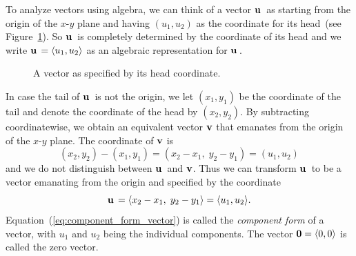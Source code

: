 To analyze vectors using algebra, we can think of a vector $\operatorname*{\mathbf{u}}{}$
as starting from the origin of the $x$-$y$ plane and having
$(u_1, u_2)$ as the coordinate for its head~(see
Figure~\ref{fig:specify_vector_head_coordinate}). So $\operatorname*{\mathbf{u}}{}$ is
completely determined by the coordinate of its head and we write
$\operatorname*{\mathbf{u}}{} = \langle u_1, u_2 \rangle$ as an algebraic representation
for $\operatorname*{\mathbf{u}}{}$.

\begin{figure}[!htpb]
\centering
{}
\caption{A vector as specified by its head coordinate.}
\label{fig:specify_vector_head_coordinate}
\end{figure}

In case the tail of $\operatorname*{\mathbf{u}}{}$ is not the
origin, we let $(x_1, y_1)$ be the coordinate of the tail and denote
the coordinate of the head by $(x_2, y_2)$. By subtracting
coordinatewise, we obtain an equivalent vector $\operatorname*{\mathbf{v}}$ that emanates
from the origin of the $x$-$y$ plane. The coordinate of $\operatorname*{\mathbf{v}}$ is
\[
(x_2, y_2) - (x_1, y_1)
=
(x_2 - x_1,\; y_2 - y_1)
=
(u_1, u_2)
\]
and we do not distinguish between $\operatorname*{\mathbf{u}}{}$ and $\operatorname*{\mathbf{v}}$. Thus we
can transform $\operatorname*{\mathbf{u}}{}$ to be a vector emanating from the origin and
specified by the coordinate
%
\begin{equation}
\label{eq:component_form_vector}
\operatorname*{\mathbf{u}}{}
=
\langle x_2 - x_1,\; y_2 - y_1 \rangle
=
\langle u_1, u_2 \rangle.
\end{equation}
%
Equation~(\ref{eq:component_form_vector}) is called the
\emph{component form} of a vector, with $u_1$
and $u_2$ being the individual components. The vector
$\operatorname*{\textbf{0}} = \langle 0, 0 \rangle$ is called the zero
vector.

